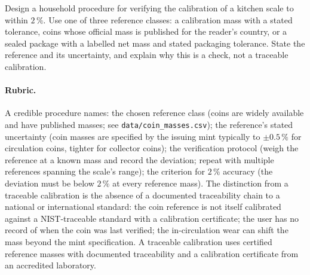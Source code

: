 \begin{exercise}
Design a household procedure for verifying the calibration of a
kitchen scale to within $2\,\%$. Use one of three reference classes:
a calibration mass with a stated tolerance, coins whose official mass
is published for the reader's country, or a sealed package with a
labelled net mass and stated packaging tolerance. State the
reference and its uncertainty, and explain why this is a check, not a
traceable calibration.

\paragraph{Rubric.} A credible procedure names: the chosen reference
class (coins are widely available and have published masses; see
\texttt{data/coin\_masses.csv}); the reference's stated uncertainty
(coin masses are specified by the issuing mint typically to
$\pm 0.5\,\%$ for circulation coins, tighter for collector coins);
the verification protocol (weigh the reference at a known mass and
record the deviation; repeat with multiple references spanning the
scale's range); the criterion for $2\,\%$ accuracy (the deviation
must be below $2\,\%$ at every reference mass). The distinction from
a traceable calibration is the absence of a documented traceability
chain to a national or international standard: the coin reference is
not itself calibrated against a NIST-traceable standard with a
calibration certificate; the user has no record of when the coin
was last verified; the in-circulation wear can shift the mass beyond
the mint specification. A traceable calibration uses certified
reference masses with documented traceability and a calibration
certificate from an accredited laboratory.
\end{exercise}

